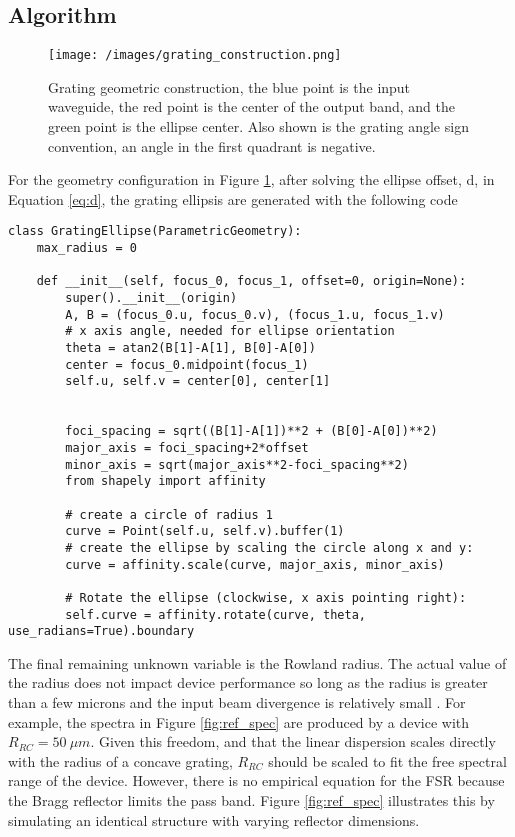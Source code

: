 \documentclass{article}
\begin{document}
    
    
    \subsection{Algorithm}
    
    \begin{figure}[H]        
    \centering
    \scriptsize 
    \texttt{[image: /images/grating\_construction.png]}
    \caption{\label{fig:grating_angles} Grating geometric construction, the blue point is the input waveguide, the red point is the center of the output band, and the green point is the ellipse center. Also shown is the grating angle sign convention, an angle in the first quadrant is negative.}
    \end{figure}
    
    For the geometry configuration in Figure \ref{fig:grating_angles}, after solving the ellipse offset, d, in Equation \ref{eq:d}, the grating ellipsis are generated with the following code 
\begin{lstlisting}
class GratingEllipse(ParametricGeometry):
    max_radius = 0

    def __init__(self, focus_0, focus_1, offset=0, origin=None):
        super().__init__(origin)
        A, B = (focus_0.u, focus_0.v), (focus_1.u, focus_1.v)
        # x axis angle, needed for ellipse orientation
        theta = atan2(B[1]-A[1], B[0]-A[0])  
        center = focus_0.midpoint(focus_1)
        self.u, self.v = center[0], center[1]
        
        
        foci_spacing = sqrt((B[1]-A[1])**2 + (B[0]-A[0])**2)
        major_axis = foci_spacing+2*offset
        minor_axis = sqrt(major_axis**2-foci_spacing**2)
        from shapely import affinity
        
        # create a circle of radius 1
        curve = Point(self.u, self.v).buffer(1)
        # create the ellipse by scaling the circle along x and y:
        curve = affinity.scale(curve, major_axis, minor_axis)
        
        # Rotate the ellipse (clockwise, x axis pointing right):
        self.curve = affinity.rotate(curve, theta, use_radians=True).boundary
\end{lstlisting}
    The final remaining unknown variable is the Rowland radius. The actual value of the radius does not impact device performance so long as the radius is greater than a few microns and the input beam divergence is relatively small \cite{Packirisamy2012Mono-OrderGrating}. For example, the spectra in Figure \ref{fig:ref_spec} are produced by a device with $R_{RC} = 50 \ \mu m$. Given this freedom, and that the linear dispersion scales directly with the radius of a concave grating, $R_{RC}$ should be scaled to fit the free spectral range of the device. However, there is no empirical equation for the FSR because the Bragg reflector limits the pass band. Figure \ref{fig:ref_spec} illustrates this by simulating an identical structure with varying reflector dimensions.
    
\end{document}
